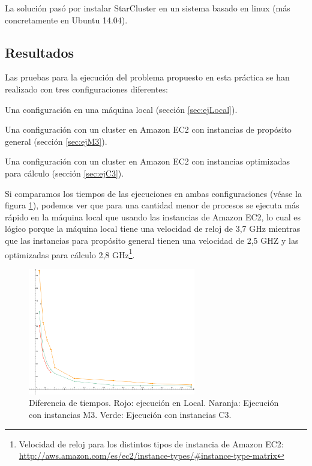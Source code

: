 \documentclass{article}
\begin{document}
	La solución pasó por instalar StarCluster en un sistema basado en linux (más concretamente en Ubuntu 14.04).

\subsection{Resultados}\label{sec:ConclusionResultados}
	Las pruebas para la ejecución del problema propuesto en esta práctica se han realizado con tres configuraciones diferentes:
{\setlength{\parskip}{0mm}\begin{enumerate}
{\setlength{\parskip}{0mm}
	\item Una configuración en una máquina local (sección \ref{sec:ejLocal}).
	\item Una configuración con un cluster en Amazon EC2 con instancias de propósito general (sección \ref{sec:ejM3}).
	\item Una configuración con un cluster en Amazon EC2 con instancias optimizadas para cálculo (sección \ref{sec:ejC3}).
}
\end{enumerate}}
	Si comparamos los tiempos de las ejecuciones en ambas configuraciones (véase la figura \ref{fig:time}), podemos ver que para una cantidad menor de procesos se ejecuta más rápido en la máquina local que usando las instancias de Amazon EC2, lo cual es lógico porque la máquina local tiene una velocidad de reloj de 3,7 GHz mientras que las instancias para propósito general tienen una velocidad de 2,5 GHZ y las optimizadas para cálculo 2,8 GHz\footnote{ Velocidad de reloj para los distintos tipos de instancia de Amazon EC2: \url{http://aws.amazon.com/es/ec2/instance-types/\#instance-type-matrix}}.


\begin{figure}[h]
  \centering
    \includegraphics[width=0.65\textwidth]{img/time.pdf}
  \caption{Diferencia de tiempos. Rojo: ejecución en Local. Naranja: Ejecución con instancias M3. Verde: Ejecución con instancias C3.}
  \label{fig:time}
\end{figure}
\end{document}
